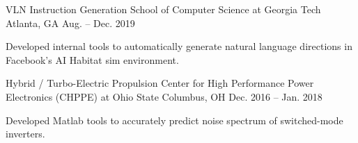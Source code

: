 

\begin{cventries}

  \cventry
    {VLN Instruction Generation} %
    {School of Computer Science at Georgia Tech} %
    {Atlanta, GA} %
    {Aug. – Dec. 2019} %
    {
      \begin{cvitems} %
        \item {Developed internal tools to automatically generate natural language directions in Facebook’s AI Habitat sim environment.}
      \end{cvitems}
    }

  \cventry
    {Hybrid / Turbo-Electric Propulsion} %
    {Center for High Performance Power Electronics (CHPPE) at Ohio State} %
    {Columbus, OH} %
    {Dec. 2016 – Jan. 2018} %
    {
      \begin{cvitems} %
        \item {Developed Matlab tools to accurately predict noise spectrum of switched-mode inverters.}
      \end{cvitems}
    }

\end{cventries}
